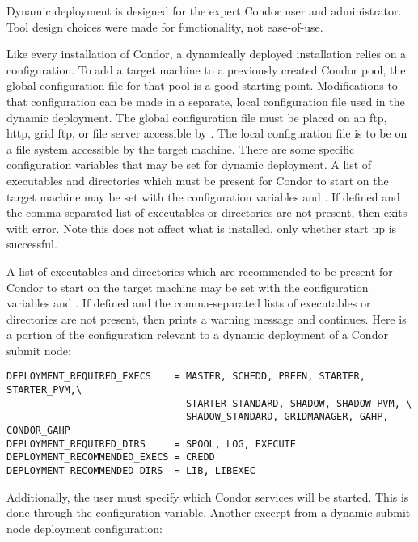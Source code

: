 Dynamic deployment is designed for the expert Condor user
and administrator.
Tool design choices were made for functionality,
not ease-of-use.

Like every installation of Condor, a dynamically deployed installation
relies on a configuration.
To add a target
machine to a previously created Condor pool,
the global configuration file for that pool is a good starting point.
Modifications to that configuration can be made in a separate, 
local configuration file used in the dynamic deployment.
The global configuration file must
be placed on an ftp, http, grid ftp, or file server 
accessible by .  The local configuration file
is to be on a file system accessible by the target machine.
There are some specific configuration variables that may be set for
dynamic deployment.  
A list of executables and directories which must be present
for Condor to start on the target machine may be set with
the configuration variables  and
. 
If defined and the comma-separated list of executables or directories are
not present, then  exits with error.
Note this does not affect what is installed, only
whether start up is successful. 

A list of executables and directories which are recommended to be present
for Condor to start on the target machine may be set with
the configuration variables  and
. 
If defined and the comma-separated lists of executables or directories are
not present, then  prints a warning message
and continues.
Here is a portion of the configuration relevant to
a dynamic deployment of a Condor submit node:

\footnotesize
\begin{verbatim}
DEPLOYMENT_REQUIRED_EXECS    = MASTER, SCHEDD, PREEN, STARTER, STARTER_PVM,\
                               STARTER_STANDARD, SHADOW, SHADOW_PVM, \
                               SHADOW_STANDARD, GRIDMANAGER, GAHP, CONDOR_GAHP
DEPLOYMENT_REQUIRED_DIRS     = SPOOL, LOG, EXECUTE
DEPLOYMENT_RECOMMENDED_EXECS = CREDD
DEPLOYMENT_RECOMMENDED_DIRS  = LIB, LIBEXEC
\end{verbatim}
\normalsize

Additionally, the user must
specify which Condor services will be started.  This is done through
the \MacroNI{DAEMON\_LIST} configuration variable.  Another excerpt
from a dynamic submit node deployment configuration:

